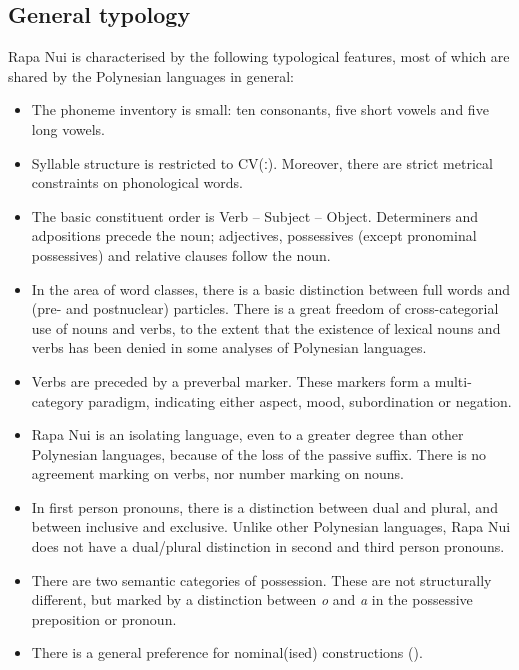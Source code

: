 \subsection{General typology}\label{sec:1.3.1}

Rapa Nui is characterised by the following typological features, most of which are shared by the Polynesian languages in general:

\begin{itemize}
\item 
The phoneme inventory is small: ten consonants, five short vowels and five long vowels.

\item 
Syllable structure is restricted to CV(ː). Moreover, there are strict metrical constraints on phonological words.

\item 
The basic constituent order is Verb – Subject – Object. Determiners and adpositions precede the noun; adjectives, possessives (except pronominal possessives) and relative clauses follow the noun.

\item 
In the area of word classes, there is a basic distinction between full words and (pre- and postnuclear) particles. There is a great freedom of cross-categorial use of nouns and verbs, to the extent that the existence of lexical nouns and verbs has been denied in some analyses of Polynesian languages.

\item 
Verbs are preceded by a preverbal marker. These markers form a multi-category paradigm, indicating either aspect, mood, subordination or negation.

\item 
Rapa Nui is an isolating language, even to a greater degree than other Polynesian languages, because of the loss of the passive suffix. There is no agreement marking on verbs, nor number marking on nouns.

\item 
In first person pronouns, there is a distinction between dual and plural, and between inclusive and exclusive. Unlike other Polynesian languages, Rapa Nui does not have a dual/plural distinction in second and third person pronouns.

\item 
There are two semantic categories of possession. These are not structurally different, but marked by a distinction between \textit{o} and \textit{a} in the possessive preposition or pronoun.

\item 
There is a general preference for nominal(ised) constructions (). 

\end{itemize}

